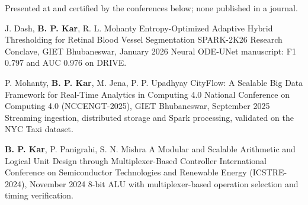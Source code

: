 
Presented at and certified by the conferences below; none published in a journal.

\vspace{6pt}

\cvpublication
{J. Dash, \textbf{B. P. Kar}, R. L. Mohanty}
{Entropy-Optimized Adaptive Hybrid Thresholding for Retinal Blood Vessel Segmentation}
{SPARK-2K26 Research Conclave, GIET Bhubaneswar, January 2026}
{Neural ODE-UNet manuscript: F1 0.797 and AUC 0.976 on DRIVE.}

\cvpublication
{P. Mohanty, \textbf{B. P. Kar}, M. Jena, P. P. Upadhyay}
{CityFlow: A Scalable Big Data Framework for Real-Time Analytics in Computing 4.0}
{National Conference on Computing 4.0 (NCCENGT-2025), GIET Bhubaneswar, September 2025}
{Streaming ingestion, distributed storage and Spark processing, validated on the NYC Taxi dataset.}

\cvpublication
{\textbf{B. P. Kar}, P. Panigrahi, S. N. Mishra}
{A Modular and Scalable Arithmetic and Logical Unit Design through Multiplexer-Based Controller}
{International Conference on Semiconductor Technologies and Renewable Energy (ICSTRE-2024), November 2024}
{8-bit ALU with multiplexer-based operation selection and timing verification.}
